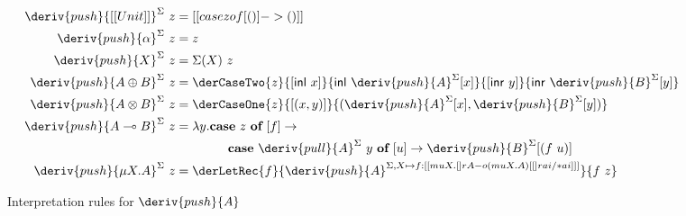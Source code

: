 %
\begin{figure}
\begin{align*}
\hspace{-1em}\deriv{push}{[[ Unit ]]}^\Sigma \ z & = [[ case z of [ () ] -> () ]]
\\
\hspace{-1em}\deriv{push}{\alpha}^\Sigma       \ z & = z
  \\
  \deriv{push}{X}^\Sigma     \ z & = \Sigma(X)\ z
\\
\hspace{-1em}\deriv{push}{A \oplus B}^\Sigma \ z & =
\derCaseTwo{z}{[\mathsf{inl}\ x]}{\mathsf{inl}\ \deriv{push}{A}^{\Sigma}[x]}{[\mathsf{inr}\ y]}
                            {\mathsf{inr}\
                                      \deriv{push}{B}^{\Sigma}[y]}
\\
\hspace{-1em}\deriv{push}{A \otimes B}^\Sigma \ z & =
\derCaseOne{z}{[(x, y)]}
   {(\deriv{push}{A}^{\Sigma}[x], \deriv{push}{B}^{\Sigma}[y])}
\\
\hspace{-1em}\deriv{push}{A \multimap B}^\Sigma \ z & = \lambda y . \textbf{case}\ z\ \textbf{of}\ [f] \rightarrow \\ 
  & \;\;\;\;\;\;\;\;\;\;\;\;\;\;\; \textbf{case}\ \deriv{pull}{A}^{\Sigma}\ y\ \textbf{of}\ [u] \rightarrow 
  {\deriv{push}{B}^{\Sigma}[(f\ u)]}
\\
\hspace{-1em}\deriv{push}{\mu X . A}^\Sigma \ z & =
 \derLetRec{f}{\deriv{push}{A}^{\Sigma, X \mapsto
f : [[ {mu X . {[] r A}} -o {{(mu X . A)} [ [] r ai /* ai ]} ]] }}{f\ z}
\end{align*}
\caption{Interpretation rules for $\deriv{push}{A}$}
\label{fig:push-interp}
\end{figure}

